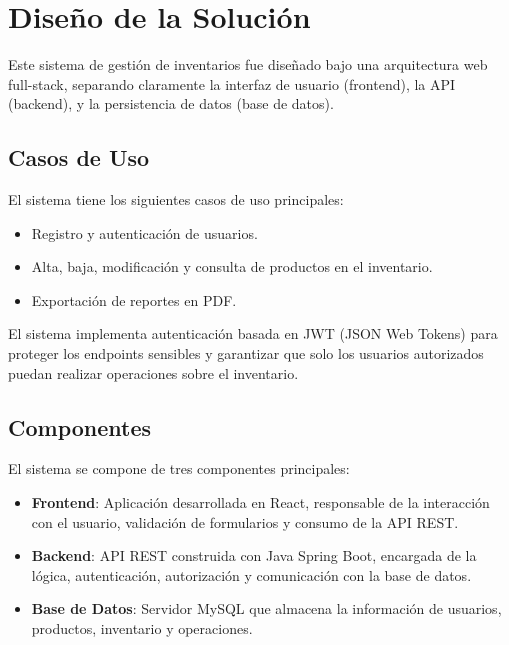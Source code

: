 \section{Diseño de la Solución}

Este sistema de gestión de inventarios fue diseñado bajo una arquitectura web full-stack, separando claramente la interfaz de usuario (frontend), la API (backend), y la persistencia de datos (base de datos).

\subsection{Casos de Uso}

El sistema tiene los siguientes casos de uso principales:

\begin{itemize}
    \item Registro y autenticación de usuarios.
    \item Alta, baja, modificación y consulta de productos en el inventario.
    \item Exportación de reportes en PDF.
\end{itemize}

El sistema implementa autenticación basada en JWT (JSON Web Tokens) para proteger los endpoints sensibles y garantizar que solo los usuarios autorizados puedan realizar operaciones sobre el inventario.


\subsection{Componentes}

El sistema se compone de tres componentes principales:

\begin{itemize}
    \item \textbf{Frontend}: Aplicación desarrollada en React, responsable de la interacción con el usuario, validación de formularios y consumo de la API REST.
    \item \textbf{Backend}: API REST construida con Java Spring Boot, encargada de la lógica, autenticación, autorización y comunicación con la base de datos.
    \item \textbf{Base de Datos}: Servidor MySQL que almacena la información de usuarios, productos, inventario y operaciones.
\end{itemize}

